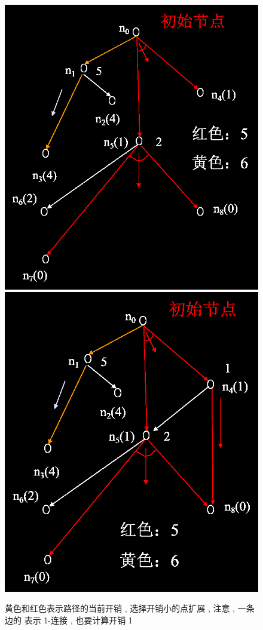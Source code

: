 \documentclass[UTF8,a4paper]{ctexart}
\begin{document}
\begin{figure}[H]
	\includegraphics[scale = 0.15]{assets/ArtificialIntelligence_c0b3a.png}
	\includegraphics[scale = 0.15]{assets/ArtificialIntelligence_8de7f.png}
	\caption{黄色和红色表示路径的当前开销 , 选择开销小的点扩展 , 注意 , 一条边的 表示 1-连接 , 也要计算开销 1}
\end{figure}
\end{document}
